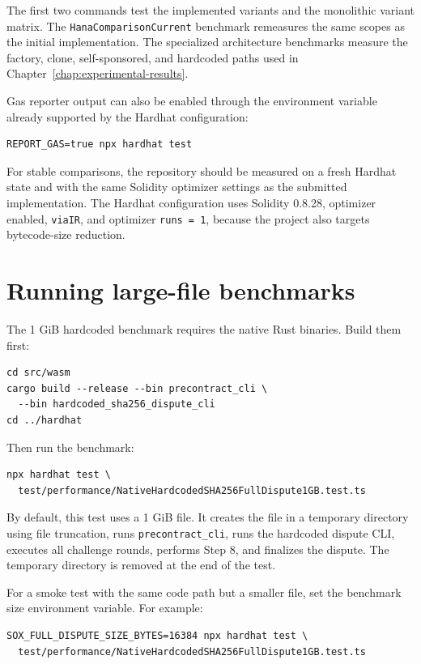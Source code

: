 The first two commands test the implemented variants and the monolithic variant matrix. The
\texttt{HanaComparisonCurrent} benchmark remeasures the same scopes as the initial
implementation. The specialized architecture benchmarks measure the factory, clone,
self-sponsored, and hardcoded paths used in Chapter~\ref{chap:experimental-results}.

Gas reporter output can also be enabled through the environment variable already supported
by the Hardhat configuration:

\begin{verbatim}
REPORT_GAS=true npx hardhat test
\end{verbatim}

For stable comparisons, the repository should be measured on a fresh Hardhat state and with
the same Solidity optimizer settings as the submitted implementation. The Hardhat
configuration uses Solidity 0.8.28, optimizer enabled, \texttt{viaIR}, and optimizer
\texttt{runs = 1}, because the project also targets bytecode-size reduction.

\section{Running large-file benchmarks}

The 1 GiB hardcoded benchmark requires the native Rust binaries. Build them first:

\begin{verbatim}
cd src/wasm
cargo build --release --bin precontract_cli \
  --bin hardcoded_sha256_dispute_cli
cd ../hardhat
\end{verbatim}

Then run the benchmark:

\begin{verbatim}
npx hardhat test \
  test/performance/NativeHardcodedSHA256FullDispute1GB.test.ts
\end{verbatim}

By default, this test uses a 1 GiB file. It creates the file in a temporary directory using
file truncation, runs \texttt{precontract\_cli}, runs the hardcoded dispute CLI, executes
all challenge rounds, performs Step 8, and finalizes the dispute. The temporary directory
is removed at the end of the test.

For a smoke test with the same code path but a smaller file, set the benchmark
size environment variable. For example:

\begin{verbatim}
SOX_FULL_DISPUTE_SIZE_BYTES=16384 npx hardhat test \
  test/performance/NativeHardcodedSHA256FullDispute1GB.test.ts
\end{verbatim}

